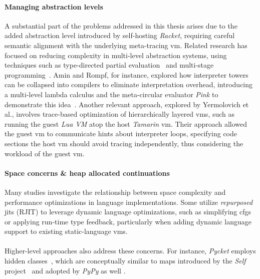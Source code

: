         \paragraph{Managing abstraction levels}%
            A substantial part of the problems addressed in this thesis arises due to the added abstraction level introduced by self-hosting \emph{Racket}, requiring careful semantic alignment with the underlying meta-tracing \gls{vm}. Related research has focused on reducing complexity in multi-level abstraction systems, using techniques such as type-directed partial evaluation~\cite{tdpe:99} and multi-stage programming~\cite{multi-stage:17}. Amin and Rompf, for instance, explored how interpreter towers can be collapsed into compilers to eliminate interpretation overhead, introducing a multi-level lambda calculus and the meta-circular evaluator \emph{Pink} to demonstrate this idea~\cite{collapse:17}. Another relevant approach, explored by Yermolovich et al., involves trace-based optimization of hierarchically layered \glspl{vm}, such as running the guest \emph{Lua VM}\cite{LuaJITLanguageToolkit} atop the host \emph{Tamarin} \gls{vm}\cite{tamarin}. Their approach allowed the guest \gls{vm} to communicate hints about interpreter loops, specifying code sections the host \gls{vm} should avoid tracing independently, thus considering the workload of the guest \gls{vm}.

        \paragraph{Space concerns \& heap allocated continuations}%
            Many studies investigate the relationship between space complexity and performance optimizations in language implementations. Some utilize \emph{repurposed} \glspl{jit} (RJIT) to leverage dynamic language optimizations, such as simplifying \glspl{cfg}\cite{dynStatComp:12} or applying run-time type feedback\cite{stJITdyn:12}, particularly when adding dynamic language support to existing static-language \glspl{vm}.

        \paragraph{}%
            Higher-level approaches also address these concerns. For instance, \emph{Pycket} employs hidden classes~\cite{pycketmain2}, which are conceptually similar to maps introduced by the \emph{Self} project~\cite{self-maps:89} and adopted by \emph{PyPy} as well \cite{runtime-feedback:11}.


